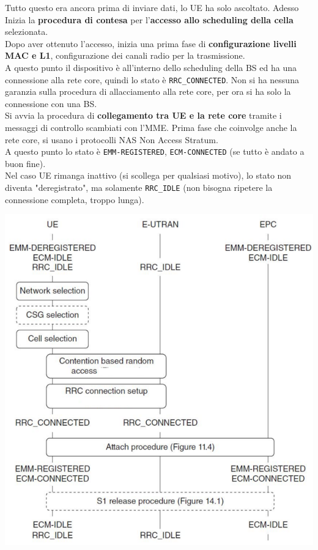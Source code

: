 Tutto questo era ancora prima di inviare dati, lo UE ha solo ascoltato.  Adesso Inizia la \textbf{procedura di contesa} per l'\textbf{accesso allo scheduling della cella} selezionata. \\

Dopo aver ottenuto l'accesso, inizia una prima fase di \textbf{configurazione livelli MAC e L1}, configurazione dei canali radio per la trasmissione.\\

A questo punto il dispositivo è all'interno dello scheduling della BS ed ha una connessione alla rete core, quindi lo stato è \texttt{RRC\_CONNECTED}. Non si ha nessuna garanzia sulla procedura di allacciamento alla rete core, per ora si ha solo la connessione con una BS.\\

Si avvia la procedura di \textbf{collegamento tra UE e la rete core} tramite i messaggi di controllo scambiati con l'MME. Prima fase che coinvolge anche la rete core, si usano i protocolli NAS Non Access Stratum.\\

A questo punto lo stato è \texttt{EMM-REGISTERED}, \texttt{ECM-CONNECTED} (se tutto è andato a buon fine).\\

Nel caso UE rimanga inattivo (si scollega per qualsiasi motivo), lo stato non diventa "deregistrato", ma solamente \texttt{RRC\_IDLE} (non bisogna ripetere la connessione completa, troppo lunga).

\begin{center}
	\includegraphics[width=0.75\linewidth]{img/4g/collop}
\end{center}

